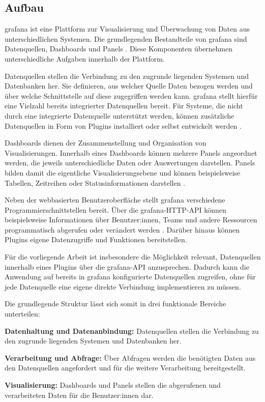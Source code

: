 \subsection{Aufbau}
\label{subsec:grafana-buildup}

\gls{grafana} ist eine Plattform zur Visualisierung und Überwachung von
Daten aus unterschiedlichen Systemen. Die grundlegenden Bestandteile
von \gls{grafana} sind Datenquellen, Dashboards und Panels
\cite{grafana2026dashboardsoverview}. Diese Komponenten übernehmen
unterschiedliche Aufgaben innerhalb der Plattform.

Datenquellen stellen die Verbindung zu den zugrunde liegenden
Systemen und Datenbanken her. Sie definieren, aus welcher Quelle Daten
bezogen werden und über welche Schnittstelle auf diese zugegriffen
werden kann. \gls{grafana} stellt hierfür eine Vielzahl bereits
integrierter Datenquellen bereit. Für Systeme, die nicht durch eine
integrierte Datenquelle unterstützt werden, können zusätzliche
Datenquellen in Form von Plugins installiert oder selbst entwickelt
werden \cite{grafana2026datasources}.

Dashboards dienen der Zusammenstellung und Organisation von
Visualisierungen. Innerhalb eines Dashboards können mehrere Panels
angeordnet werden, die jeweils unterschiedliche Daten oder
Auswertungen darstellen. Panels bilden damit die eigentliche
Visualisierungsebene und können beispielsweise Tabellen,
Zeitreihen oder Statusinformationen darstellen
\cite{grafana2026dashboardsoverview}.

Neben der webbasierten Benutzeroberfläche stellt \gls{grafana}
verschiedene Programmierschnittstellen bereit. Über die
\gls{grafana}-HTTP-API können beispielsweise Informationen über
Benutzer:innen, Teams und andere Ressourcen programmatisch abgerufen
oder verändert werden \cite{grafana2026httpapi}. Darüber hinaus können
Plugins eigene Datenzugriffe und Funktionen bereitstellen.

Für die vorliegende Arbeit ist insbesondere die Möglichkeit relevant,
Datenquellen innerhalb eines Plugins über die \gls{grafana}-API
anzusprechen. Dadurch kann die Anwendung auf bereits in
\gls{grafana} konfigurierte Datenquellen zugreifen, ohne für jede
Datenquelle eine eigene direkte Verbindung implementieren zu müssen.

Die grundlegende Struktur lässt sich somit in drei funktionale
Bereiche unterteilen:

\begin{compactitem}
    \item \textbf{Datenhaltung und Datenanbindung:} Datenquellen
    stellen die Verbindung zu den zugrunde liegenden Systemen und
    Datenbanken her.
    
    \item \textbf{Verarbeitung und Abfrage:} Über Abfragen werden die
    benötigten Daten aus den Datenquellen angefordert und für die
    weitere Verarbeitung bereitgestellt.
    
    \item \textbf{Visualisierung:} Dashboards und Panels stellen die
    abgerufenen und verarbeiteten Daten für die Benutzer:innen dar.
\end{compactitem}

